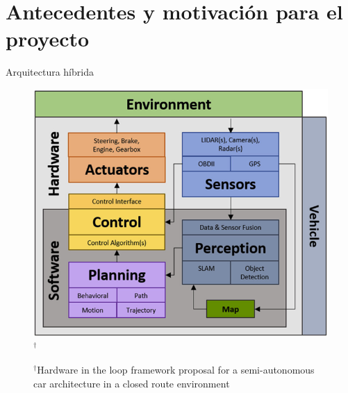 \documentclass[
	12pt, %
	aspectratio=169, %
]{beamer}
\begin{document}
\section{Antecedentes y motivación para el proyecto}
\begin{frame}{Arquitectura híbrida}
  \begin{figure}
    \centering
    \includegraphics[scale=0.30]{control_autonomo2}$^\dag$\\
    \rule{0in}{1.2em}$^\dag$\scriptsize Hardware in the loop framework proposal for a semi-autonomous car architecture in a closed route environment \cite{CurielRamirez2019}\\
    
  \end{figure}
\end{frame}
\end{document}
